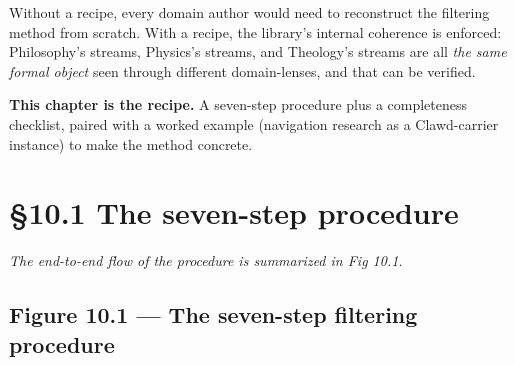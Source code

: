 \documentclass[11pt, openany]{book}
\newcommand{\sectionbreak}{\clearpage}
\begin{document}
Without a recipe, every domain author would need to reconstruct the filtering method from scratch. With a recipe, the library's internal coherence is enforced: Philosophy's streams, Physics's streams, and Theology's streams are all \textit{the same formal object} seen through different domain-lenses, and that can be verified.

\textbf{This chapter is the recipe.} A seven-step procedure plus a completeness checklist, paired with a worked example (navigation research as a Clawd-carrier instance) to make the method concrete.

\sectionbreak

\section{§10.1 The seven-step procedure}

\textit{The end-to-end flow of the procedure is summarized in Fig 10.1.}

\subsection{Figure 10.1 --- The seven-step filtering procedure}
\end{document}
